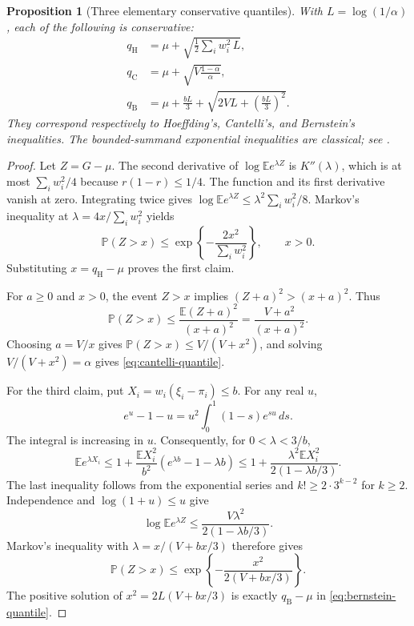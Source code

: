 \documentclass[11pt,letterpaper]{article}
\numberwithin{equation}{section}
\newtheorem{proposition}[theorem]{Proposition}
\theoremstyle{definition}
\theoremstyle{remark}
\begin{document}
\begin{proposition}[Three elementary conservative quantiles]
\label{prop:elementary-quantiles}
With $L=\log(1/\alpha)$, each of the following is conservative:
\begin{align}
 q_{\mathrm H}
   &=\mu+\sqrt{\frac12\sum_i w_i^2\,L},
       \label{eq:hoeffding-quantile}\\
 q_{\mathrm C}
   &=\mu+\sqrt{V\frac{1-\alpha}{\alpha}},
       \label{eq:cantelli-quantile}\\
 q_{\mathrm B}
   &=\mu+\frac{bL}{3}
       +\sqrt{2VL+\left(\frac{bL}{3}\right)^2}.
       \label{eq:bernstein-quantile}
\end{align}
They correspond respectively to Hoeffding's, Cantelli's, and Bernstein's
inequalities. The bounded-summand exponential inequalities are classical;
see \cite{hoeffding1963,bennett1962}.
\end{proposition}
\begin{proof}
Let $Z=G-\mu$. The second derivative of
$\log\mathbb{E}e^{\lambda Z}$ is $K''(\lambda)$, which is at most
$\sum_iw_i^2/4$ because $r(1-r)\le1/4$. The function and its first
derivative vanish at zero. Integrating twice gives
$\log\mathbb{E}e^{\lambda Z}\le\lambda^2\sum_iw_i^2/8$.
Markov's inequality at $\lambda=4x/\sum_iw_i^2$ yields
\begin{equation}
  \mathbb{P}(Z>x)\le
  \exp\left\{-\frac{2x^2}{\sum_iw_i^2}\right\},\qquad x>0.
  \label{eq:hoeffding-tail}
\end{equation}
Substituting $x=q_{\mathrm H}-\mu$ proves the first claim.

For $a\ge0$ and $x>0$, the event $Z>x$ implies
$(Z+a)^2>(x+a)^2$. Thus
\[
  \mathbb{P}(Z>x)
  \le\frac{\mathbb{E}(Z+a)^2}{(x+a)^2}
  =\frac{V+a^2}{(x+a)^2}.
\]
Choosing $a=V/x$ gives $\mathbb{P}(Z>x)\le V/(V+x^2)$, and solving
$V/(V+x^2)=\alpha$ gives \eqref{eq:cantelli-quantile}.

For the third claim, put $X_i=w_i(\xi_i-\pi_i)\le b$. For any real $u$,
\[
  e^u-1-u=u^2\int_0^1(1-s)e^{su}\,ds.
\]
The integral is increasing in $u$. Consequently, for $0<\lambda<3/b$,
\[
  \mathbb{E}e^{\lambda X_i}
  \le1+\frac{\mathbb{E}X_i^2}{b^2}
                  (e^{\lambda b}-1-\lambda b)
  \le1+\frac{\lambda^2\mathbb{E}X_i^2}
                  {2(1-\lambda b/3)}.
\]
The last inequality follows from the exponential series and
$k!\ge2\cdot3^{k-2}$ for $k\ge2$. Independence and $\log(1+u)\le u$ give
\[
  \log\mathbb{E}e^{\lambda Z}
       \le\frac{V\lambda^2}{2(1-\lambda b/3)}.
\]
Markov's inequality with $\lambda=x/(V+bx/3)$ therefore gives
\begin{equation}
  \mathbb{P}(Z>x)\le
       \exp\left\{-\frac{x^2}{2(V+bx/3)}\right\}.
  \label{eq:bernstein-tail}
\end{equation}
The positive solution of $x^2=2L(V+bx/3)$ is exactly
$q_{\mathrm B}-\mu$ in \eqref{eq:bernstein-quantile}.
\end{proof}
\end{document}
